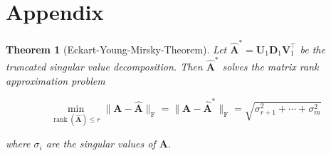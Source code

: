 \documentclass{beamer}
\theoremstyle{plain}
\newtheorem{thm}{Theorem}
\theoremstyle{definition}
\newcommand{\mat}[1]{\mathbf{#1}}
\begin{document}
\section{Appendix}

\begin{frame}
\begin{thm}[Eckart-Young-Mirsky-Theorem]
Let $\widehat{\mat{A}}^* = \mat{U}_1 \mat{D}_1 \mat{V}_1^{\top}$
be the \textit{truncated singular value decomposition}. Then $\widehat{ \mat{A}}^*$ solves the matrix rank approximation problem

$$\min_{\operatorname{rank}(\widehat{\mat{A}}) \leq r} \|\mat{A}-\widehat{\mat{A}}\|_{\text{F}} = \|\mat{A}-\widehat{\mat{A}}^*\|_{\text{F}} = \sqrt{\sigma^2_{r+1} + \cdots + \sigma^2_m}$$

where $\sigma_i$ are the singular values of $\mat A$.
\end{thm}
\end{frame}
\end{document}
